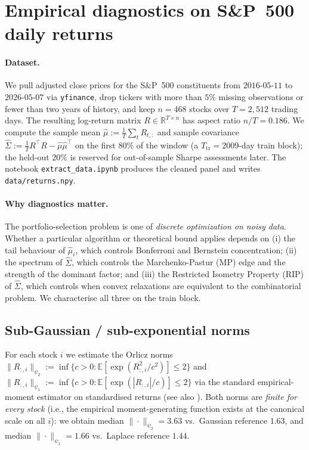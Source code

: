 
\section{Empirical diagnostics on S\&P~500 daily returns}\label{sec:diagnostics}

\paragraph{Dataset.} We pull adjusted close prices for the S\&P~500 constituents from
$2016$-$05$-$11$ to $2026$-$05$-$07$ via \texttt{yfinance}, drop tickers with more than
$5\%$ missing observations or fewer than two years of history, and keep $n=468$ stocks
over $T=2{,}512$ trading days. The resulting log-return matrix $R\in\mathbb R^{T\times n}$ has aspect
ratio $n/T=0.186$. We compute the sample mean $\hat\mu := \tfrac1T\sum_t R_{t,:}$ and
sample covariance $\hat\Sigma := \tfrac1T R^\top R - \hat\mu\hat\mu^\top$ on the first
$80\%$ of the window (a $T_{\mathrm{tr}}=2009$-day train block); the held-out $20\%$ is reserved
for out-of-sample Sharpe assessments later. The notebook \texttt{extract\_data.ipynb} produces
the cleaned panel and writes \texttt{data/returns.npy}.

\paragraph{Why diagnostics matter.} The portfolio-selection problem is one of \emph{discrete
optimization on noisy data}. Whether a particular algorithm or theoretical bound applies
depends on (i) the tail behaviour of $\hat\mu_i$, which controls Bonferroni and Bernstein
concentration; (ii) the spectrum of $\hat\Sigma$, which controls the Marchenko-Pastur (MP)
edge and the strength of the dominant factor; and (iii) the Restricted Isometry Property
(RIP) of $\hat\Sigma$, which controls when convex relaxations are equivalent to the
combinatorial problem. We characterise all three on the train block.

\subsection{Sub-Gaussian / sub-exponential norms}\label{ssec:psi}

For each stock $i$ we estimate the Orlicz norms
$\|R_{:,i}\|_{\psi_2} := \inf\{c>0: \mathbb E[\exp(R_{:,i}^2/c^2)]\le 2\}$ and
$\|R_{:,i}\|_{\psi_1} := \inf\{c>0: \mathbb E[\exp(|R_{:,i}|/c)]\le 2\}$ via the standard
empirical-moment estimator on standardised returns \cite[Ch.~2]{vershynin} (see also \cite[Ch.~2]{wainwright}). Both norms are \emph{finite for every
stock} (i.e., the empirical moment-generating function exists at the canonical scale on
all $i$): we obtain median $\|\cdot\|_{\psi_2}=3.63$ vs.\ Gaussian reference $1.63$, and
median $\|\cdot\|_{\psi_1}=1.66$ vs.\ Laplace reference $1.44$.

